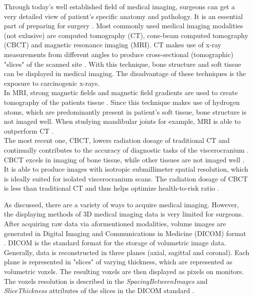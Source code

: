 Through today's well established field of medical imaging, surgeons can get a very detailed view of patient’s specific anatomy and pathology. 
It is an essential part of preparing for surgery \cite{Steinbacher.2015}.
Most commonly used medical imaging modalities (not exlusive) are computed tomography (CT), cone-beam computed tomography (CBCT) and magnetic resonance imaging (MRI).
CT makes use of x-ray measurements from different angles to produce cross-sectional (tomographic) "slices" of the scanned site \cite{Handels.2009}.
With this technique, bone structure and soft tissue can be displayed in medical imaging.
The disadvantage of these techniques is the exposure to carcinogenic x-rays.
\\
In MRI, strong magnetic fields and magnetic field gradients are used to create tomography of the patients tissue \cite{Handels.2009}.
Since this technique makes use of hydrogen atoms, which are predominantly present in patient's soft tissue, bone structure is not imaged well.
When studying mandibular joints for example, MRI is able to outperform CT \cite{RN65}.
\\
The most recent one, CBCT, lowers radiation dosage of traditional CT and continually contributes to the accuracy of diagnostic tasks of the viscerocranium \cite{Vos.2009}.
CBCT excels in imaging of bone tissue, while other tissues are not imaged well \cite{Vos.2009}.
It is able to produce images with isotropic submillimeter spatial resolution, which is ideally suited for isolated viscerocranium scans. 
The radiation dosage of CBCT is less than traditional CT and thus helps optimize health-to-risk ratio \cite{WHITE2008689}.

As discussed, there are a variety of ways to acquire medical imaging.
However, the displaying methods of 3D medical imaging data is very limited for surgeons.
After acquiring raw data via aformentioned modalities, volume images are generated in Digital Imaging and Communications in Medicine (DICOM) format \cite{DICOMStandard}.
DICOM is the standard format for the storage of volumetric image data.
Generally, data is reconstructed in three planes (axial, sagittal and coronal).
Each plane is represented in "slices" of varying thickness, which are represented as volumetric voxels.
The resulting voxels are then displayed as pixels on monitors.
The voxels resolution is described in the \textit{SpacingBetweenImages} and \textit{SliceThickness} attributes of the slices in the DICOM standard \cite{DICOMStandard}.

